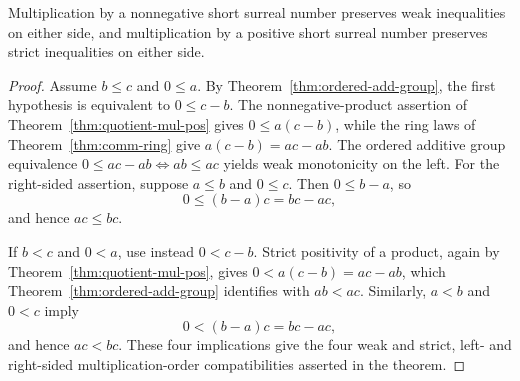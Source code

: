 \begin{theorem}
  \label{thm:quotient-mul-mono}
  \leanok
  Multiplication by a nonnegative short surreal number preserves weak inequalities on either
  side, and multiplication by a positive short surreal number preserves strict inequalities on
  either side.
\end{theorem}
\begin{proof}
  \leanok
  Assume \(b\leq c\) and \(0\leq a\).  By
  Theorem~\ref{thm:ordered-add-group}, the first hypothesis is equivalent to
  \(0\leq c-b\).  The nonnegative-product assertion of
  Theorem~\ref{thm:quotient-mul-pos} gives \(0\leq a(c-b)\), while the ring
  laws of Theorem~\ref{thm:comm-ring} give \(a(c-b)=ac-ab\).  The ordered
  additive group equivalence
  \(0\leq ac-ab\Longleftrightarrow ab\leq ac\) yields weak monotonicity on
  the left.  For the right-sided assertion, suppose \(a\leq b\) and
  \(0\leq c\).  Then \(0\leq b-a\), so
  \[
    0\leq(b-a)c=bc-ac,
  \]
  and hence \(ac\leq bc\).

  If \(b<c\) and \(0<a\), use instead \(0<c-b\).  Strict positivity of a
  product, again by Theorem~\ref{thm:quotient-mul-pos}, gives
  \(0<a(c-b)=ac-ab\), which Theorem~\ref{thm:ordered-add-group} identifies
  with \(ab<ac\).  Similarly, \(a<b\) and \(0<c\) imply
  \[
    0<(b-a)c=bc-ac,
  \]
  and hence \(ac<bc\).  These four implications give the four weak and strict,
  left- and right-sided multiplication-order compatibilities asserted in the
  theorem.
\end{proof}


